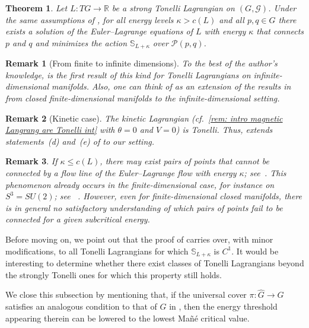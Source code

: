 \documentclass[11pt,reqno]{amsart}
\theoremstyle{plain}
\newtheorem{thm}{Theorem}[section]
\newtheorem{rem}[thm]{Remark}
\theoremstyle{definition}
\theoremstyle{plain} %
\newtheorem{rem}[rem]{Remark}
\theoremstyle{definition} %
\numberwithin{equation}{section}
\def\G{\mathcal{G}}
\def\RR{{\mathbb R}}
\begin{document}
\begin{thm}\label{thm: Hopf-Rinow for Tonelli int} 
Let $L : TG \to \RR$ be a strong Tonelli Lagrangian on $(G,\G)$.
Under the same assumptions of , for all energy levels $\kappa > c(L)$ and all $p,q \in G$ there exists a solution of the Euler--Lagrange equations of $L$ with energy $\kappa$ that connects \( p \) and \( q \) and minimizes the action $\mathbb{S}_{L+\kappa}$ over \( \mathcal P(p, q) \).

\end{thm}
\begin{rem}[From finite to infinite dimensions]
    To the best of the author's knowledge,  
    is the first result of this kind for Tonelli Lagrangians on 
    infinite-dimensional manifolds. 
    Also, one can think of  as an extension of the results in~\cite[Cor.~B]{Co06} 
    from closed finite-dimensional manifolds to the infinite-dimensional setting.
\end{rem}

\begin{rem}[Kinetic case]
    The kinetic Lagrangian (cf.\ \cref{rem: intro magnetic Langrang are Tonelli int} with \( \theta = 0\) and \( V = 0\)) is Tonelli. Thus,  extends statements~(d) and~(e) of \cite[Thm.~7.7]{Bauer_2025} to our setting.
\end{rem}
\begin{rem}
    If \( \kappa \le c(L) \), there may exist pairs of points that cannot be connected by 
    a flow line of the Euler--Lagrange flow with energy \( \kappa \); see~\cite{M24}. 
    This phenomenon already occurs in the finite-dimensional case, for instance on 
    \( S^3 = SU(2) \); see ~\cite{ALBERS2025105521}. 
    However, even for finite-dimensional closed manifolds, there is in general no 
    satisfactory understanding of which pairs of points fail to be connected for a 
    given subcritical energy.
\end{rem}
Before moving on, we point out that the proof of  carries over, with minor modifications, to all Tonelli Lagrangians for which \( \mathbb{S}_{L+\kappa} \) is \( C^1 \). 
It would be interesting to determine whether there exist classes of Tonelli Lagrangians beyond the strongly Tonelli ones for which this property still holds. 

We close this subsection by mentioning that, if the universal cover \( \pi \colon \hat{G} \to G \) satisfies an analogous condition to that of \( G \) in , 
then the energy threshold appearing therein can be lowered to the lowest Mañé critical value. 
\end{document}
